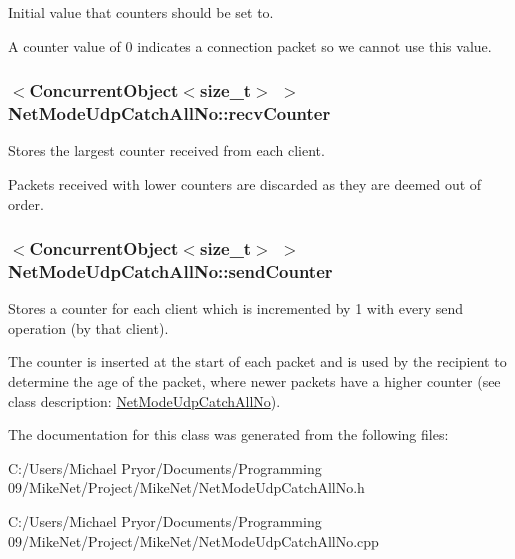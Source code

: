 Initial value that counters should be set to. 

A counter value of 0 indicates a connection packet so we cannot use this value. \hypertarget{class_net_mode_udp_catch_all_no_a09585b76e3e50cebc9ad0fa795810228}{
\subsubsection[{recvCounter}]{$<${\bf ConcurrentObject}$<$size\_\-t$>$ $>$ {\bf NetModeUdpCatchAllNo::recvCounter}}}
\label{class_net_mode_udp_catch_all_no_a09585b76e3e50cebc9ad0fa795810228}


Stores the largest counter received from each client. 

Packets received with lower counters are discarded as they are deemed out of order. \hypertarget{class_net_mode_udp_catch_all_no_a69712e7ab73688db35d386613174e325}{
\subsubsection[{sendCounter}]{$<${\bf ConcurrentObject}$<$size\_\-t$>$ $>$ {\bf NetModeUdpCatchAllNo::sendCounter}}}
\label{class_net_mode_udp_catch_all_no_a69712e7ab73688db35d386613174e325}


Stores a counter for each client which is incremented by 1 with every send operation (by that client). 

The counter is inserted at the start of each packet and is used by the recipient to determine the age of the packet, where newer packets have a higher counter (see class description: \hyperlink{class_net_mode_udp_catch_all_no}{NetModeUdpCatchAllNo}). 

The documentation for this class was generated from the following files:\begin{DoxyCompactItemize}
\item 
C:/Users/Michael Pryor/Documents/Programming 09/MikeNet/Project/MikeNet/NetModeUdpCatchAllNo.h\item 
C:/Users/Michael Pryor/Documents/Programming 09/MikeNet/Project/MikeNet/NetModeUdpCatchAllNo.cpp\end{DoxyCompactItemize}
